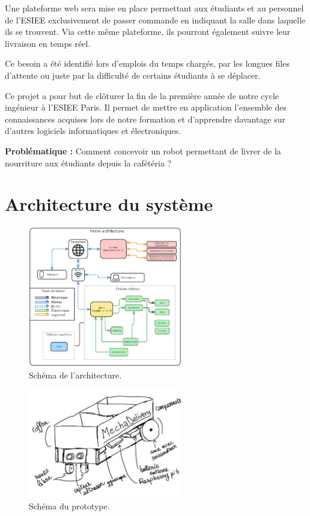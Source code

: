 \documentclass[a4paper,12pt]{report}  %
\begin{document}
Une plateforme web sera mise en place permettant aux étudiants et au
personnel de l'ESIEE exclusivement de passer commande en indiquant la
salle dans laquelle ils se trouvent. Via cette même plateforme, ils
pourront également suivre leur livraison en temps réel.

Ce besoin a été identifié lors d'emplois du temps
chargés, par les longues files d'attente ou juste par la
difficulté de certains étudiants à se déplacer.

Ce projet a pour but de clôturer la fin de la première année de notre
cycle ingénieur à l'ESIEE Paris. Il permet de mettre en
application l'ensemble des connaissances acquises lors
de notre formation et d'apprendre davantage sur
d'autres logiciels informatiques et électroniques.

\textbf{Problématique :} Comment concevoir un robot permettant
de livrer de la nourriture aux étudiants depuis la cafétéria ?

\section{Architecture du système}

\begin{figure}[H]
	\centering
	\includegraphics[width=0.6\textwidth]{./attachments/arch/2025-06-21-1200_Architecture.pdf}
	\caption{Schéma de l'architecture. }

\end{figure}

\begin{figure}[H]
	\centering
	\includegraphics[width=0.6\textwidth]{./attachments/sketch.jpg}
	\caption{Schéma du prototype. }

\end{figure}
\end{document}
